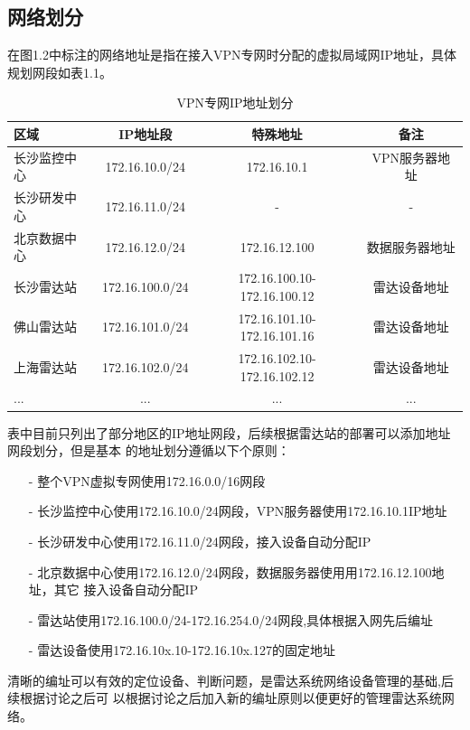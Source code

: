 \documentclass[a4paper,12pt]{report}
\begin{document}
\begin{spacing}{1.5}
\section{网络划分}
在图1.2中标注的网络地址是指在接入VPN专网时分配的虚拟局域网IP地址，具体规划网段如表1.1。
\begin{table}[hbtp]
	\centering
	\begin{tabular}{|l|c|c|c|}
	\hline
	区域 & IP地址段 & 特殊地址 & 备注\\
	\hline
	长沙监控中心 & 172.16.10.0/24  & 172.16.10.1   & VPN服务器地址\\
	\hline
	长沙研发中心 & 172.16.11.0/24  & - & -\\
	\hline
	北京数据中心 & 172.16.12.0/24  & 172.16.12.100 & 数据服务器地址\\
	\hline
	长沙雷达站   & 172.16.100.0/24 & 172.16.100.10-172.16.100.12 & 雷达设备地址\\
	\hline
	佛山雷达站   & 172.16.101.0/24 & 172.16.101.10-172.16.101.16 & 雷达设备地址\\
	\hline
	上海雷达站   & 172.16.102.0/24 & 172.16.102.10-172.16.102.12 & 雷达设备地址\\
	\hline
	...    		& ...             & ... & ...\\
	\hline
	\end{tabular}
	\caption{VPN专网IP地址划分}
	\label{tab:IPaddress}
\end{table}

表中目前只列出了部分地区的IP地址网段，后续根据雷达站的部署可以添加地址网段划分，但是基本
的地址划分遵循以下个原则：
\begin{itemize}
\itemsep=3pt
\parskip=0pt
\setlength{\itemindent}{1em} 
\item[-] 整个VPN虚拟专网使用172.16.0.0/16网段
\item[-] 长沙监控中心使用172.16.10.0/24网段，VPN服务器使用172.16.10.1IP地址
\item[-] 长沙研发中心使用172.16.11.0/24网段，接入设备自动分配IP
\item[-] 北京数据中心使用172.16.12.0/24网段，数据服务器使用用172.16.12.100地址，其它
接入设备自动分配IP
\item[-] 雷达站使用172.16.100.0/24-172.16.254.0/24网段,具体根据入网先后编址
\item[-] 雷达设备使用172.16.10x.10-172.16.10x.127的固定地址
\end{itemize}

清晰的编址可以有效的定位设备、判断问题，是雷达系统网络设备管理的基础,后续根据讨论之后可
以根据讨论之后加入新的编址原则以便更好的管理雷达系统网络。


\end{spacing}
\end{document}

